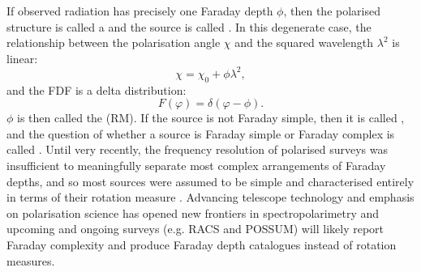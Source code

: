         If observed radiation has precisely one Faraday depth $\phi$, then the polarised structure is called a  and the source is called . In this degenerate case, the relationship between the polarisation angle $\chi$ and the squared wavelength $\lambda^2$ is linear:
        \begin{equation}
            \chi = \chi_0 + \phi \lambda^2,
        \end{equation}
        and the FDF is a delta distribution:
        \begin{equation}
            F(\varphi) = \delta(\varphi - \phi).
        \end{equation}
        $\phi$ is then called the  (RM). If the source is not Faraday simple, then it is called , and the question of whether a source is Faraday simple or Faraday complex is called . Until very recently, the frequency resolution of polarised surveys was insufficient to meaningfully separate most complex arrangements of Faraday depths, and so most sources were assumed to be simple and characterised entirely in terms of their rotation measure \citep[e.g.][]{taylor_rotation_2009}. Advancing telescope technology and emphasis on polarisation science has opened new frontiers in spectropolarimetry and upcoming and ongoing surveys (e.g. RACS and POSSUM) will likely report Faraday complexity and produce Faraday depth catalogues instead of rotation measures.

